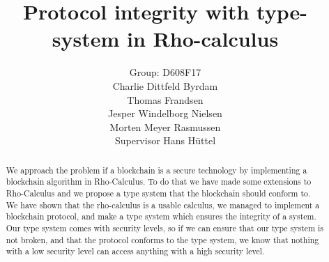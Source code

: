 \mainmatter  %

\title{Protocol integrity with type-system in Rho-calculus}




\author{Group: D608F17\\Charlie Dittfeld Byrdam\\Thomas Frandsen\\Jesper Windelborg Nielsen\\Morten Meyer Rasmussen\\Supervisor Hans Hüttel}




\toctitle{}
\tocauthor{}
\maketitle
\clearpage
\begin{abstract}
We approach the problem if a blockchain is a secure technology by implementing a blockchain algorithm in Rho-Calculus. To do that we have made some extensions to Rho-Calculus and we propose a type system that the blockchain should conform to. We have shown that the rho-calculus is a usable calculus, we managed to implement a blockchain protocol, and make a type system which ensures the integrity of a system. Our type system comes with security levels, so if we can ensure that our type system is not broken, and that the protocol conforms to the type system, we know that nothing with a low security level can access anything with a high security level.
\end{abstract}
